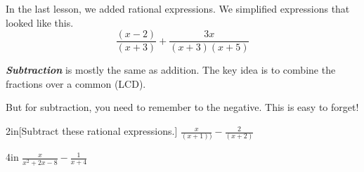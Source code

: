 In the last lesson, we added rational expressions. 
We simplified expressions that looked like this.
\[
    \frac
    {(x-2)}
    {(x+3)}
    +
    \frac
    {3x}
    {(x+3)(x+5)}
\]

\begin{myCenteredBox}[width=6in,]
    {\bfseries\itshape Subtraction} 
    is mostly the same as addition.
    The key idea is to combine the fractions 
    over a common  (LCD).\par
    \vspace{1em}
    But for subtraction, 
    you need to remember to  the negative.
    This is easy to forget!
\end{myCenteredBox}

\begin{myWideProblem}{2in}[Subtract these rational expressions.]
    {
        $
        \frac{x}{(x+1))}
        -
        \frac{2}{(x+2)}
        $
    }
\end{myWideProblem}
\begin{myWideProblem}{4in}
    {
        $
        \frac{x}{x^2+2x-8}
        -
        \frac{1}{x+4}
        $
    }
\end{myWideProblem}
